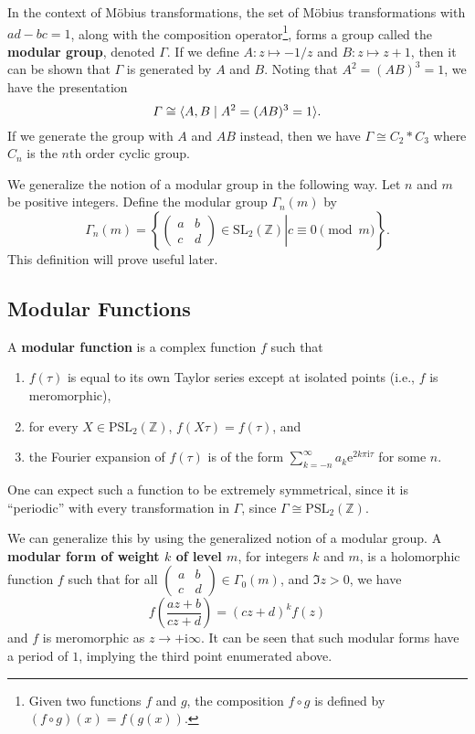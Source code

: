 \documentclass{microdoc}
\newcommand{\ee}{\ensuremath{\mathrm{e}}}
\newcommand{\ii}{\ensuremath{\mathrm{i}}}
\newcommand{\SL}{\ensuremath{\mathrm{SL}}}
\newcommand{\PSL}{\ensuremath{\mathrm{PSL}}}
\newcommand{\defn}[1]{\textbf{#1}}
\begin{document}
In the context of M\"obius transformations, the set of M\"obius
transformations with $ad-bc=1$, along with the composition
operator\footnote{Given two functions $f$ and $g$, the composition
  $f\circ g$ is defined by $(f\circ g)(x) = f(g(x))$.}, forms a group
called the \defn{modular group}, denoted $\varGamma$. If we define
$A:z\mapsto -1/z$ and $B:z\mapsto z+1$, then it can be shown that
$\varGamma$ is generated by $A$ and $B$. Noting that $A^2=(AB)^3=1$,
we have the presentation \[\varGamma \cong \langle A,B \mid
A^2=(AB)^3=1\rangle\text.\] If we generate the group with $A$ and $AB$
instead, then we have $\varGamma\cong C_2*C_3$ where $C_n$ is the
$n$th order cyclic group.

We generalize the notion of a modular group in the following way. Let
$n$ and $m$ be positive integers. Define the modular group
$\varGamma_n(m)$ by
\begin{equation}
  \varGamma_n(m) =
\left\{
\left.
\begin{pmatrix}
a & b\\
c & d
\end{pmatrix}
\in\SL_2(\mathbb{Z})\right\vert
c\equiv 0 \pmod{m}
\right\}\text{.}
\end{equation}
This definition will prove useful later.

\subsection{Modular Functions}
A \defn{modular function} is a complex function $f$ such that
\begin{enumerate}
  \item $f(\tau)$ is equal to its own Taylor series except at isolated
  points (i.e., $f$ is meromorphic),
  \item for every $X\in\PSL_2(\mathbb{Z})$, $f(X\tau) = f(\tau)$, and
  \item the Fourier expansion of $f(\tau)$ is of the form
  $\sum_{k=-n}^\infty a_k \ee^{2k\pi\ii\tau}$ for some $n$.
\end{enumerate}
One can expect such a function to be extremely symmetrical, since it
is ``periodic'' with every transformation in $\varGamma$, since
$\varGamma\cong\PSL_2(\mathbb{Z})$.

We can generalize this by using the generalized notion of a modular
group. A \defn{modular form of weight $k$ of level $m$}, for integers
$k$ and $m$, is a holomorphic function $f$ such that for all $\left(
\begin{smallmatrix}
a & b\\
c & d
\end{smallmatrix}\right)\in\varGamma_0(m)$, and $\Im z > 0$, we
have \[f\left(\frac{az+b}{cz+d}\right)=(cz+d)^k f(z)\] and $f$ is
meromorphic as $z\to +\ii\infty$. It can be seen that such modular
forms have a period of $1$, implying the third point enumerated above.
\end{document}
